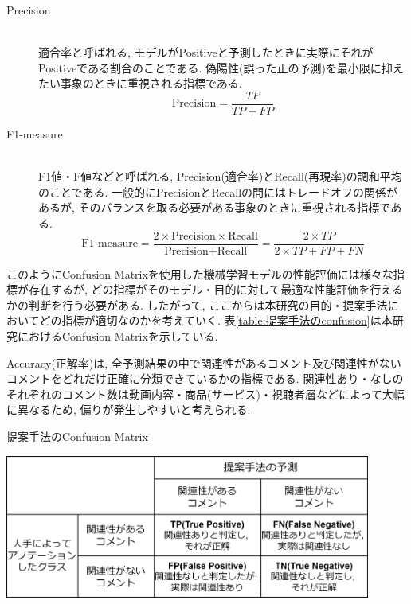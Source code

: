 \documentclass{ltjarticle}
\begin{document}
\begin{description}
    \item[Precision]\mbox{}\\
    適合率と呼ばれる, モデルがPositiveと予測したときに実際にそれがPositiveである割合のことである. 
    偽陽性(誤った正の予測)を最小限に抑えたい事象のときに重視される指標である. \\
    \begin{equation}
        \textrm{Precision} = \dfrac{TP}{TP+FP}
        \label{equation:Precision}
    \end{equation}
    \vspace{5truept}

    \item[F1-measure]\mbox{}\\
    F1値・F値などと呼ばれる, Precision(適合率)とRecall(再現率)の調和平均のことである. 
    一般的にPrecisionとRecallの間にはトレードオフの関係があるが, そのバランスを取る必要がある事象のときに重視される指標である. \\
    \begin{equation}
        \textrm{F1-measure} = \dfrac{2\times \textrm{Precision}\times \textrm{Recall}}{\textrm{Precision}+\textrm{Recall}} = \dfrac{2\times TP}{2\times TP+FP+FN}
        \label{equation:F1}
    \end{equation}
    \vspace{5truept}

\end{description}

このようにConfusion Matrixを使用した機械学習モデルの性能評価には様々な指標が存在するが, 
どの指標がそのモデル・目的に対して最適な性能評価を行えるかの判断を行う必要がある. 
したがって, ここからは本研究の目的・提案手法においてどの指標が適切なのかを考えていく. 
表\ref{table:提案手法のconfusion}は本研究におけるConfusion Matrixを示している. 

Accuracy(正解率)は, 全予測結果の中で関連性があるコメント及び関連性がないコメントをどれだけ正確に分類できているかの指標である. 
関連性あり・なしのそれぞれのコメント数は動画内容・商品(サービス)・視聴者層などによって大幅に異なるため, 
偏りが発生しやすいと考えられる. 
\vspace{3truept}

\begin{table}[ht]
    \centering
    \caption{提案手法のConfusion Matrix}
    \vspace{5truept}

    \includegraphics[width = 12cm]{images/提案手法のconfusion.drawio.png}
    \label{table:提案手法のconfusion}
\end{table}
\vspace{5truept}
\end{document}
